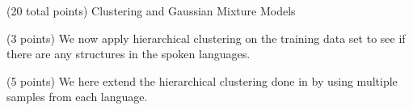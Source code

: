 \documentclass[12pt]{article}
\begin{document}
\begin{question}{(20 total points) Clustering and Gaussian Mixture Models}
\begin{subquestion}{(3 points)
       We now apply hierarchical clustering on the training data set
       to see if there are any structures in the spoken languages.
     }
     

  


   \end{subquestion}
   \begin{subquestion}{(5 points)
       We here extend the hierarchical clustering done in  by
       using multiple samples from each language.
     } \label{Q3.4}


   


\end{subquestion}
\end{question}
\end{document}
